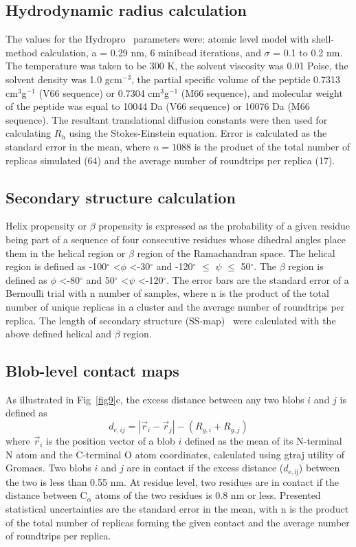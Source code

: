 \documentclass[10pt,letterpaper]{article}
\begin{document}
\subsection*{Hydrodynamic radius calculation} 
The values for the Hydropro~\cite{Ortega2011} parameters were: atomic level model with shell-method calculation, a = 0.29 nm, 6 minibead iterations, and $\sigma$ = 0.1 to 0.2 nm. The temperature was taken to be 300 K, the solvent viscosity was 0.01 Poise, the solvent density was 1.0 gcm$^{-3}$, the partial specific volume of the peptide 0.7313 cm$^{3}$g$^{-1}$ (V66 sequence) or 0.7304 cm$^{3}$g$^{-1}$ (M66 sequence), and molecular weight of the peptide was equal to 10044 Da (V66 sequence) or 10076 Da (M66 sequence). The resultant translational diffusion constants were then used for calculating $R_h$ using the Stokes-Einstein equation. Error is calculated as the standard error in the mean, where $n = 1088$ is the product of the total number of replicas simulated (64) and the average number of roundtrips per replica (17).

\subsection*{Secondary structure calculation} Helix propensity or $\beta$ propensity is expressed as the probability of a given residue being part of a sequence of four consecutive residues whose dihedral angles place them in the helical region or $\beta$ region of the Ramachandran space. The helical region is defined as -100$^{\circ}$ \textless $\phi$ \textless -30$^{\circ}$ and -120$^{\circ}$ $\leq$ $\psi$ $\leq$ 50$^{\circ}$\cite{Nodet,Garcia2002,Knott2012b}. The $\beta$ region is defined as $\phi$ \textless -80$^{\circ}$ and 50$^{\circ}$ \textless $\psi$ \textless -120$^{\circ}$. The error bars are the standard error of a Bernoulli trial with n number of samples, where n is the product of the total number of unique replicas in a cluster and the average number of roundtrips per replica. The length of secondary structure (SS-map)~\cite{Iglesias2013} were calculated with the above defined helical and $\beta$ region.

\subsection*{Blob-level contact maps}
As illustrated in Fig~\ref{fig9}c, the excess distance between any two blobs $i$ and $j$ is defined as \begin{equation}d_{e,ij} = {|\vec{r}_i - \vec{r}_j |} - (R_{g,i}+R_{g,j})\label{eq:overlap2}\end{equation} where $\vec{r}_i$ is the position vector of a blob $i$ defined as the mean of its N-terminal N atom and the C-terminal O atom coordinates, calculated using g\textunderscore traj utility of Gromacs. Two blobs $i$ and $j$ are in contact if the excess distance ($d_{\mathrm{e,ij}}$) between the two is less than 0.55 nm. At residue level, two residues are in contact if the distance between C$_{\alpha}$ atoms of the two residues is 0.8 nm or less.
Presented statistical uncertainties are the standard error in the mean, with n is the product of the total number of replicas forming the given contact and the average number of roundtrips per replica.
\end{document}
